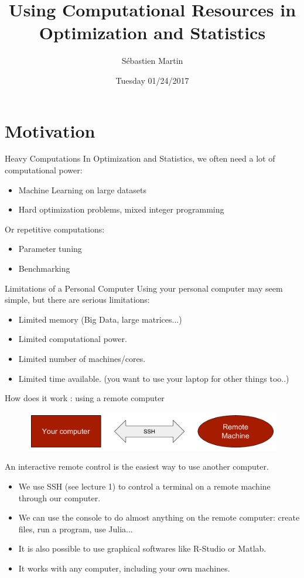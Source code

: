 \documentclass{beamer}
\title[IAP-2017]{Using Computational Resources in Optimization and Statistics}
\author{Sébastien Martin}
\institute{MIT}
\date{Tuesday 01/24/2017}
\begin{document}
\begin{frame}
  \titlepage
\end{frame}


\section{Motivation}

\begin{frame}{Heavy Computations}
  In Optimization and Statistics, we often need a lot of computational power:
  \begin{itemize}
    \item Machine Learning on large datasets
    \item Hard optimization problems, mixed integer programming
  \end{itemize}
  \pause
  Or repetitive computations:
  \begin{itemize}
    \item Parameter tuning
    \item Benchmarking
  \end{itemize}
\end{frame}

\begin{frame}{Limitations of a Personal Computer}
  Using your personal computer may seem simple, but there are serious limitations:
  \begin{itemize}
    \item<1-> Limited \alert{memory} (Big Data, large matrices...)
    \item<2-> Limited \alert{computational power}.
    \item<3-> Limited \alert{number of machines}/cores.
    \item<4-> Limited \alert{time} available. (you want to use your laptop for other things too..)
  \end{itemize}
\end{frame}

\begin{frame}{How does it work : using a remote computer}
  \begin{figure}
    \includegraphics[width=\linewidth]{figures/iap2017-diagram1}
  \end{figure}
  An interactive remote control is the easiest way to use another computer.
  \begin{itemize}
    \item We use \alert{SSH} (see lecture 1) to control a terminal on a remote machine through our computer.
    \item We can use the \alert{console} to do almost anything on the remote computer: create files, run a program, use Julia...
    \item It is also possible to use graphical softwares like \alert{R-Studio or Matlab}.
    \item It works with any computer, including your own machines.
  \end{itemize}
\end{frame}
\end{document}
